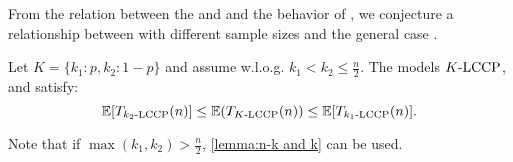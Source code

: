 From the relation between the \ekecd and  and the behavior of , 
we conjecture a relationship between \ekecd[k] with different sample sizes and the general case \efmecd.

\begin{conjecture}
\label{conjecture:expected:(k1,k2)-MECD relation with k-ECD}
    Let $K = \{k_1:p, k_2:1-p\}$ and assume w.l.o.g. $k_1 < k_2 \leq \frac{n}{2}$. 
    The models $\fmecd{K}{}{n}$,  and  satisfy:
    $$
    \E[\T{\kecd{k_2}{n}}{n}] \leq \E(\T{\fmecd{K}{}{n}}{n}) \leq \E[\T{\kecd{k_1}{n}}{n}].
    $$
\end{conjecture}
Note that if $\max(k_1,k_2) > \frac{n}{2} $, \autoref{lemma:n-k and k} can be used.
